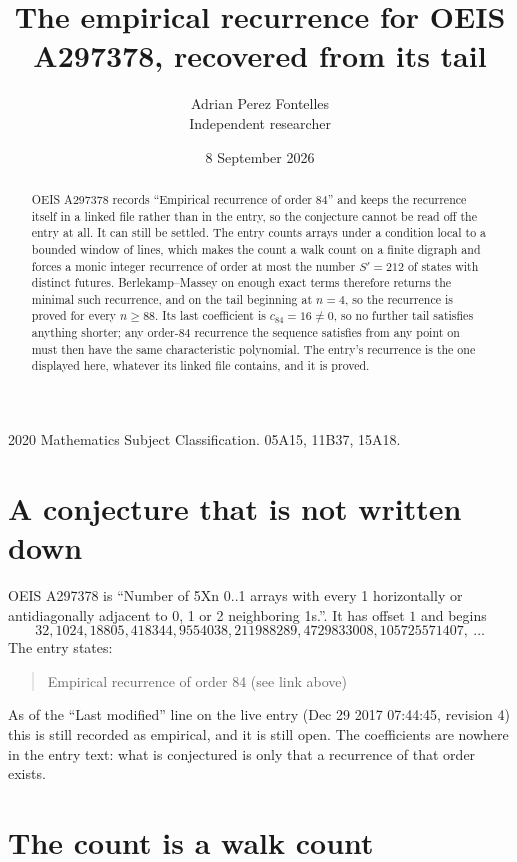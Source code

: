\documentclass[11pt,a4paper]{article}
\title{The empirical recurrence for OEIS A297378, recovered from its tail}
\author{Adrian Perez Fontelles\\ \small Independent researcher}
\date{8 September 2026}
\theoremstyle{plain}
\theoremstyle{definition}
\begin{document}
\maketitle

\begin{abstract}
OEIS A297378 records ``Empirical recurrence of order $84$'' and keeps the recurrence itself in
a linked file rather than in the entry, so the conjecture cannot be read off the entry at all.
It can still be settled. The entry counts arrays under a condition local to a bounded window of
lines, which makes the count a walk count on a finite digraph and forces a monic integer
recurrence of order at most the number $S'=212$ of states with distinct futures. Berlekamp--Massey on
enough exact terms therefore returns the minimal such recurrence, and on the tail beginning at $n=4$, so the recurrence is proved for every $n\ge88$.
Its last coefficient is $c_{84}=16\neq0$, so no further tail satisfies anything
shorter; any order-$84$ recurrence the sequence satisfies from any point on must then have
the same characteristic polynomial. The entry's recurrence is the one displayed here, whatever
its linked file contains, and it is proved.
\end{abstract}

\noindent\small 2020 Mathematics Subject Classification. 05A15, 11B37, 15A18.\normalsize

\section{A conjecture that is not written down}

OEIS A297378 is ``Number of 5Xn 0..1 arrays with every 1 horizontally or antidiagonally adjacent to 0, 1 or 2 neighboring 1s.''. It has offset $1$ and begins
\[
32, 1024, 18805, 418344, 9554038, 211988289, 4729833008, 105725571407,\ \dots
\]
The entry states:
\begin{quote}
Empirical recurrence of order 84 (see link above)
\end{quote}
As of the ``Last modified'' line on the live entry (Dec 29 2017 07:44:45, revision 4)
this is still recorded as empirical, and it is still open. The coefficients are nowhere in the
entry text: what is conjectured is only that a recurrence of that order exists.

\section{The count is a walk count}
\end{document}
